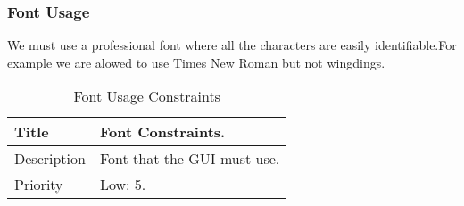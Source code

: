 \subsubsection{Font Usage}
  We must use a professional font where all the characters 
  are easily identifiable.For example we are alowed to use 
  Times New Roman but not wingdings.

  \begin{table}[h!]
    \caption{Font Usage Constraints}
    \label{system-constraints/miscellaneous/Font-Usage-table}
    \begin{tabularx}{\textwidth}{|l|X|}
      \hline
      Title       & Font Constraints. \\ \hline
      Description & Font that the GUI must use. \\ \hline
      Priority    & Low: 5. \\ \hline
    \end{tabularx}
  \end{table}
